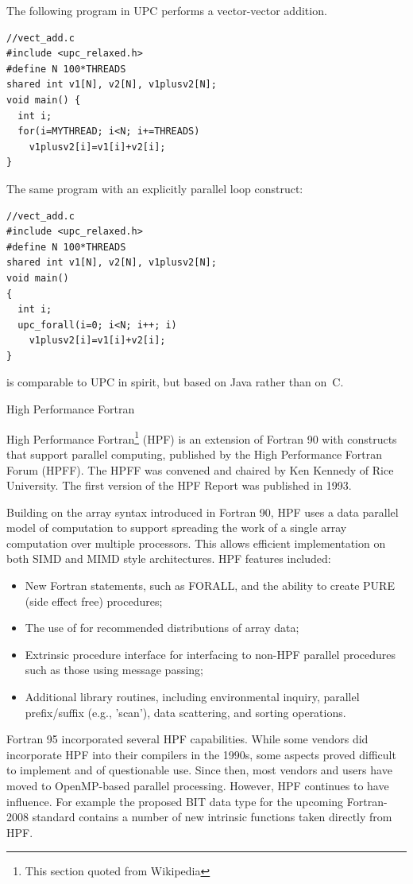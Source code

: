 The following program in \ac{UPC} performs a vector-vector addition.
\begin{verbatim}
//vect_add.c
#include <upc_relaxed.h>
#define N 100*THREADS
shared int v1[N], v2[N], v1plusv2[N];
void main() {
  int i;
  for(i=MYTHREAD; i<N; i+=THREADS)
    v1plusv2[i]=v1[i]+v2[i];
}
\end{verbatim}
The same program with an explicitly parallel loop construct:
\begin{verbatim}
//vect_add.c
#include <upc_relaxed.h>
#define N 100*THREADS
shared int v1[N], v2[N], v1plusv2[N];
void main()
{
  int i;
  upc_forall(i=0; i<N; i++; i)
    v1plusv2[i]=v1[i]+v2[i];
}
\end{verbatim}


 is comparable to \ac{UPC} in spirit, but based on Java rather
than on~C.

 {High Performance Fortran}
\label{sec:HPF}

High Performance Fortran\footnote{This section quoted from Wikipedia}
(HPF) is an extension of Fortran 90 with constructs that support
parallel computing, published by the High Performance Fortran Forum
(HPFF). The HPFF was convened and chaired by Ken Kennedy of Rice
University. The first version of the HPF Report was published in 1993.

Building on the array syntax introduced in Fortran 90, HPF uses a data
parallel model of computation to support spreading the work of a
single array computation over multiple processors. This allows
efficient implementation on both SIMD and MIMD style
architectures. HPF features included:
\begin{itemize}
\item New Fortran statements, such as FORALL, and the ability to
  create PURE (side effect free) procedures;
\item The use of  for recommended
  distributions of array data;
\item Extrinsic procedure interface for interfacing to non-HPF
  parallel procedures such as those using message passing;
\item Additional library routines, including environmental inquiry,
  parallel prefix/suffix (e.g., 'scan'), data scattering, and sorting
  operations.
\end{itemize}
Fortran 95 incorporated several HPF capabilities.  While some vendors
did incorporate HPF into their compilers in the 1990s, some aspects
proved difficult to implement and of questionable use. Since then,
most vendors and users have moved to OpenMP-based parallel
processing. However, HPF continues to have
influence. For example the proposed BIT data type for the upcoming
Fortran-2008 standard contains a number of new intrinsic functions
taken directly from HPF.

